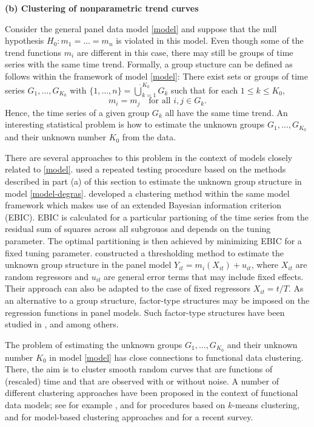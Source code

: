 \documentclass[a4paper,12pt]{article}
\begin{document}
\noindent \textbf{(b) Clustering of nonparametric trend curves} 
\vspace{10pt} 


\noindent Consider the general panel data model \eqref{model} and suppose that the null hypothesis $H_0: m_1 = \ldots = m_n$ is violated in this model. Even though some of the trend functions $m_i$ are different in this case, there may still be groups of time series with the same time trend. Formally, a group stucture can be defined as follows within the framework of model \eqref{model}: There exist sets or groups of time series $G_1,\ldots,G_{K_0}$ with $\{1,\ldots,n\} = \dot\bigcup_{k=1}^{K_0} G_k$ such that for each $1 \le k \le K_0$, 
\begin{equation}\label{model-groups}
m_i = m_j \quad \text{for all } i,j \in G_k. 
\end{equation}
Hence, the time series of a given group $G_k$ all have the same time trend. %
An interesting statistical problem is how to estimate the unknown groups $G_1,\ldots,G_{K_0}$ and their unknown number $K_0$ from the data. 


There are several approaches to this problem in the context of models closely related to \eqref{model}. \cite{DegrasWu2012} used a repeated testing procedure based on the methods described in part (a) of this section to estimate the unknown group structure in model \eqref{model-degras}. \cite{Zhang2013} developed a clustering method within the same model framework which makes use of an extended Bayesian information criterion (EBIC). EBIC is calculated for a particular partioning of the time series from the residual sum of squares across all subgrouos and depends on the tuning parameter. The optimal partitioning is then achieved by minimizing EBIC for a fixed tuning parameter. \cite{VogtLinton2017} constructed a thresholding method to estimate the unknown group structure in the panel model $Y_{it} = m_i(X_{it}) + u_{it}$, where $X_{it}$ are random regressors and $u_{it}$ are general error terms that may include fixed effects. Their approach can also be adapted to the case of fixed regressors $X_{it} = t/T$.  As an alternative to a group structure, factor-type structures may be imposed on the regression functions in panel models. Such factor-type structures have been studied in \cite{Kneip2012}, \cite{LintonVogt2015} and \cite{BonevaLintonVogt2016} among others. 


The problem of estimating the unknown groups $G_1,\ldots,G_{K_0}$ and their unknown number $K_0$ in model \eqref{model} has close connections to functional data clustering. There, the aim is to cluster smooth random curves that are functions of (rescaled) time and that are observed with or without noise. A number of different clustering approaches have been proposed in the context of functional data models; see for example \cite{Abraham2003}, \cite{Tarpey2003} and \cite{Tarpey2007} for procedures based on $k$-means clustering, \cite{James2003} and \cite{Chiou2007} for model-based clustering approaches and \cite{Jacques2014} for a recent survey. 
\end{document}
